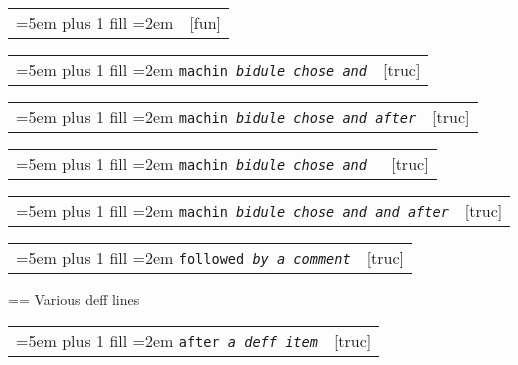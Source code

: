 \documentclass{book}
\makeatletter
\newenvironment{GNUTexinfopreformatted}{%
  \par\GNUTobeylines\obeyspaces\frenchspacing
  \parskip=\z@\parindent=\z@}{}
{\catcode`\^^M=13 \gdef\GNUTobeylines{\catcode`\^^M=13 \def^^M{\null\par}}}
\newenvironment{GNUTexinfoindented}
  {\begin{list}{}{}
  \item\relax}
  {\end{list}}
\makeatother
\begin{document}
\begin{GNUTexinfoindented}
\noindent\begin{tabularx}{\linewidth}{@{}Xr}
\rightskip=5em plus 1 fill
\hangindent=2em
\texttt{}& [fun]
\end{tabularx}


\noindent\begin{tabularx}{\linewidth}{@{}Xr}
\rightskip=5em plus 1 fill
\hangindent=2em
\texttt{machin \EmbracOn{}\textnormal{\textsl{bidule chose and}}\EmbracOff{}}& [truc]
\end{tabularx}

%

\noindent\begin{tabularx}{\linewidth}{@{}Xr}
\rightskip=5em plus 1 fill
\hangindent=2em
\texttt{machin \EmbracOn{}\textnormal{\textsl{bidule chose and  after}}\EmbracOff{}}& [truc]
\end{tabularx}

%

\noindent\begin{tabularx}{\linewidth}{@{}Xr}
\rightskip=5em plus 1 fill
\hangindent=2em
\texttt{machin \EmbracOn{}\textnormal{\textsl{bidule chose and }}\EmbracOff{}}& [truc]
\end{tabularx}

%

\noindent\begin{tabularx}{\linewidth}{@{}Xr}
\rightskip=5em plus 1 fill
\hangindent=2em
\texttt{machin \EmbracOn{}\textnormal{\textsl{bidule chose and and after}}\EmbracOff{}}& [truc]
\end{tabularx}

%

\noindent\begin{tabularx}{\linewidth}{@{}Xr}
\rightskip=5em plus 1 fill
\hangindent=2em
\texttt{followed \EmbracOn{}\textnormal{\textsl{by a comment}}\EmbracOff{}}& [truc]
\end{tabularx}

%
\begin{GNUTexinfopreformatted}%
\ttfamily Various deff lines
\end{GNUTexinfopreformatted}

\noindent\begin{tabularx}{\linewidth}{@{}Xr}
\rightskip=5em plus 1 fill
\hangindent=2em
\texttt{after \EmbracOn{}\textnormal{\textsl{a deff item}}\EmbracOff{}}& [truc]
\end{tabularx}


\end{GNUTexinfoindented}
\end{document}

